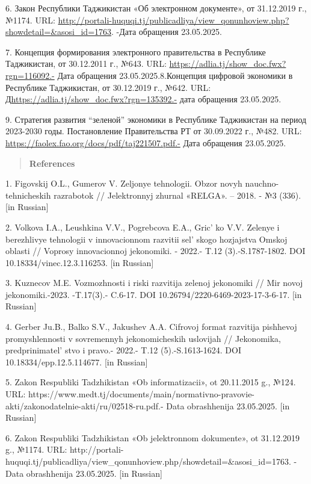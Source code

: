 6. Закон Республики Таджикистан «Об электронном документе», от 31.12.2019
г., №1174. URL:
\url{http://portali-huquqi.tj/publicadliya/view_qonunhoview.php?showdetail=&asosi_id=1763}.
-Дата обращения 23.05.2025.

7. Концепция формирования электронного правительства в Республике
Таджикистан, от 30.12.2011 г., №643. URL:
\url{https://adlia.tj/show_doc.fwx?rgn=116092.-} Дата обращения
23.05.2025.8.Концепция цифровой экономики в Республике Таджикистан, от 30.12.2019
г., №642. URL: Д\url{https://adlia.tj/show_doc.fwx?rgn=135392.-} дата
обращения 23.05.2025.

9. Стратегия развития ``зеленой'' экономики в Республике Таджикистан на
период 2023-2030 годы. Постановление Правительства РТ от 30.09.2022 г.,
№482. URL: \url{https://faolex.fao.org/docs/pdf/taj221507.pdf.-} Дата
обращения 23.05.2025.

\begin{quote}
{\bfseries References}
\end{quote}

1. Figovskij O.L., Gumerov V. Zeljonye tehnologii. Obzor novyh
nauchno-tehnicheskih razrabotok // Jelektronnyj zhurnal «RELGA». --
2018. - №3 (336). {[}in Russian{]}

2. Volkova I.A., Leushkina V.V., Pogrebcova E.A., Gric' ko
V.V. Zelenye i berezhlivye tehnologii v innovacionnom razvitii
sel' skogo hozjajstva Omskoj oblasti // Voprosy
innovacionnoj jekonomiki. - 2022.- T.12 (3).-S.1787-1802. DOI
10.18334/vinec.12.3.116253. {[}in Russian{]}

3. Kuznecov M.E. Vozmozhnosti i riski razvitija zelenoj jekonomiki // Mir
novoj jekonomiki.-2023. -T.17(3).- C.6-17. DOI
10.26794/2220-6469-2023-17-3-6-17. {[}in Russian{]}

4. Gerber Ju.B., Balko S.V., Jakushev A.A. Cifrovoj format razvitija
pishhevoj promyshlennosti v sovremennyh jekonomicheskih uslovijah //
Jekonomika, predprinimatel' stvo i pravo.- 2022.- T.12
(5).-S.1613-1624. DOI 10.18334/epp.12.5.114677. {[}in Russian{]}

5. Zakon Respubliki Tadzhikistan «Ob informatizacii», ot 20.11.2015 g.,
№124. URL:
https://www.medt.tj/documents/main/normativno-pravovie-akti/zakonodatelnie-akti/ru/02518-ru.pdf.-
Data obrashhenija 23.05.2025. {[}in Russian{]}

6. Zakon Respubliki Tadzhikistan «Ob jelektronnom dokumente», ot
31.12.2019 g., №1174. URL:
http://portali-huquqi.tj/publicadliya/view\_qonunhoview.php/showdetail=\&asosi\_id=1763.
-Data obrashhenija 23.05.2025. {[}in Russian{]}

